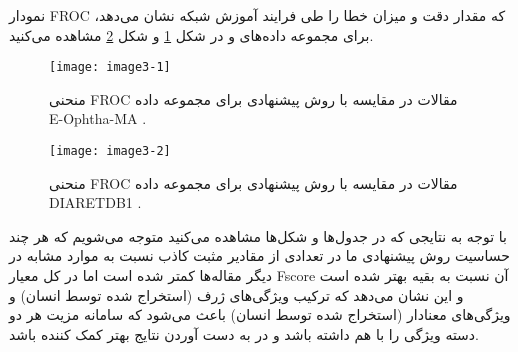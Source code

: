 \noindent
نمودار FROC که مقدار دقت و میزان خطا را طی فرایند آموزش شبکه نشان می‌دهد، برای مجموعه داده‌های  و  در شکل \ref{image5-1} و شکل ‏\ref{image5-2} مشاهده می‌کنید.

\begin{figure}[h]
\centering
  \texttt{[image: image3-1]}
  \caption{منحنی FROC مقالات در مقایسه با روش پیشنهادی برای مجموعه داده E-Ophtha-MA \cite{ref1}.}
  \label{image5-1}
\end{figure}

\begin{figure}[h]
\centering
  \texttt{[image: image3-2]}
  \caption{منحنی FROC مقالات در مقایسه با روش پیشنهادی برای مجموعه داده DIARETDB1 \cite{ref1}.}
  \label{image5-2}
\end{figure}

\noindent
با توجه به نتایجی که در جدول‌ها و شکل‌ها مشاهده می‌کنید متوجه می‌شویم که هر چند حساسیت روش پیشنهادی ما در تعدادی از مقادیر مثبت کاذب نسبت به موارد مشابه در دیگر مقاله‌ها کمتر شده است اما در کل معیار Fscore آن نسبت به بقیه بهتر شده است و این نشان می‌دهد که ترکیب ویژگی‌های ژرف (استخراج شده توسط انسان) و ویژگی‌های معنادار (استخراج شده توسط انسان) باعث می‌شود که سامانه مزیت هر دو دسته ویژگی را با هم داشته باشد و در به دست آوردن نتایج بهتر کمک کننده باشد.
